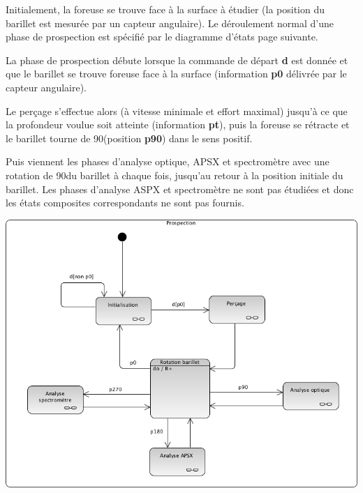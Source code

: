 \documentclass[10pt,fleqn]{article} %
\begin{document}
\begin{multicols}{2}
\begin{multicols}{2}
Initialement, la foreuse se trouve face à la surface à étudier (la position du barillet est mesurée par un capteur angulaire). Le déroulement normal d’une phase de prospection est spécifié par le diagramme d’états page suivante.

La phase de prospection débute lorsque la commande de départ \textbf{d} est donnée et que le barillet se trouve foreuse face à la surface (information \textbf{p0} délivrée par le capteur angulaire).

Le perçage s’effectue alors (à vitesse minimale et effort maximal) jusqu’à ce que la profondeur voulue soit atteinte (information \textbf{pt}), puis la foreuse se rétracte et le barillet tourne de 90\degres (position \textbf{p90}) dans le sens
positif.

Puis viennent les phases d’analyse optique, APSX et spectromètre avec une rotation de 90\degres du barillet à chaque fois, jusqu’au retour à la position initiale du barillet.
Les phases d’analyse ASPX et spectromètre ne sont pas étudiées et donc les états composites
correspondants ne sont pas fournis.

\begin{center}
\includegraphics[width=\linewidth]{images/fig_06.png}
\end{center}


\end{multicols}
\end{multicols}
\end{document}
